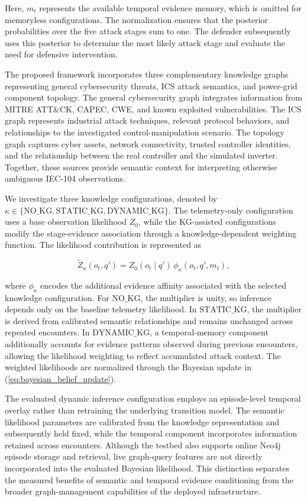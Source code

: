 \documentclass[10pt,conference]{IEEEtran}
\begin{document}
\noindent
Here, $m_t$ represents the available temporal evidence memory, which is omitted for memoryless configurations. The normalization ensures that the posterior probabilities over the five attack stages sum to one. The defender subsequently uses this posterior to determine the most likely attack stage and evaluate the need for defensive intervention.

The proposed framework incorporates three complementary knowledge graphs representing general cybersecurity threats, ICS attack semantics, and power-grid component topology. The general cybersecurity graph integrates information from MITRE ATT\&CK, CAPEC, CWE, and known exploited vulnerabilities. The ICS graph represents industrial attack techniques, relevant protocol behaviors, and relationships to the investigated control-manipulation scenario. The topology graph captures cyber assets, network connectivity, trusted controller identities, and the relationship between the real controller and the simulated inverter. Together, these sources provide semantic context for interpreting otherwise ambiguous IEC-104 observations.

We investigate three knowledge configurations, denoted by $\kappa\in\{\mathrm{NO\_KG},\mathrm{STATIC\_KG},\mathrm{DYNAMIC\_KG}\}$. The telemetry-only configuration uses a base observation likelihood $Z_0$, while the KG-assisted configurations modify the stage-evidence association through a knowledge-dependent weighting function. The likelihood contribution is represented as

\begin{equation}
\widetilde{Z}_{\kappa}(o_t,q') =
Z_0(o_t\mid q')\,
\phi_{\kappa}(o_t,q',m_t),
\label{eq:kg_conditioned_likelihood}
\end{equation}

\noindent
where $\phi_{\kappa}$ encodes the additional evidence affinity associated with the selected knowledge configuration. For $\mathrm{NO\_KG}$, the multiplier is unity, so inference depends only on the baseline telemetry likelihood. In $\mathrm{STATIC\_KG}$, the multiplier is derived from calibrated semantic relationships and remains unchanged across repeated encounters. In $\mathrm{DYNAMIC\_KG}$, a temporal-memory component additionally accounts for evidence patterns observed during previous encounters, allowing the likelihood weighting to reflect accumulated attack context. The weighted likelihoods are normalized through the Bayesian update in (\ref{eq:bayesian_belief_update}).

The evaluated dynamic inference configuration employs an episode-level temporal overlay rather than retraining the underlying transition model. The semantic likelihood parameters are calibrated from the knowledge representation and subsequently held fixed, while the temporal component incorporates information retained across encounters. Although the testbed also supports online Neo4j episode storage and retrieval, live graph-query features are not directly incorporated into the evaluated Bayesian likelihood. This distinction separates the measured benefits of semantic and temporal evidence conditioning from the broader graph-management capabilities of the deployed infrastructure.
\end{document}
